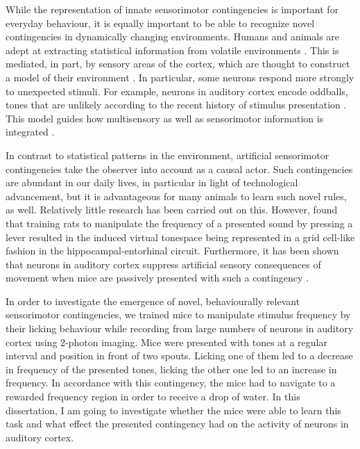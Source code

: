\documentclass[]{report}
\theoremstyle{definition}
\theoremstyle{definition}
\theoremstyle{definition}
\theoremstyle{remark}
\begin{document}
While the representation of innate sensorimotor contingencies is
important for everyday behaviour, it is equally important to be able to
recognize novel contingencies in dynamically changing environments.
Humans and animals are adept at extracting statistical information from
volatile environments \citep{behrens2007information}. This is mediated,
in part, by sensory areas of the cortex, which are thought to construct
a model of their environment \citep{berkes2011spontaneous}. In
particular, some neurons respond more strongly to unexpected stimuli.
For example, neurons in auditory cortex encode oddballs, tones that are
unlikely according to the recent history of stimulus presentation
\citep{gill2008surprise, rubin2016representation}. This model guides how
multisensory as well as sensorimotor information is integrated
\citep{gallistel2001rat, ernst2002humans, kording2004force, kording2004bayesian}.

In contrast to statistical patterns in the environment, artificial
sensorimotor contingencies take the observer into account as a causal
actor. Such contingencies are abundant in our daily lives, in particular
in light of technological advancement, but it is advantageous for many
animals to learn such novel rules, as well. Relatively little research
has been carried out on this. However, \citet{aronov2017grid} found that
training rats to manipulate the frequency of a presented sound by
pressing a lever resulted in the induced virtual tonespace being
represented in a grid cell-like fashion in the hippocampal-entorhinal
circuit. Furthermore, it has been shown that neurons in auditory cortex
suppress artificial sensory consequences of movement when mice are
passively presented with such a contingency
\citep{schneider2018cortical}.

In order to investigate the emergence of novel, behaviourally relevant
sensorimotor contingencies, we trained mice to manipulate stimulus
frequency by their licking behaviour while recording from large numbers
of neurons in auditory cortex using 2-photon imaging. Mice were
presented with tones at a regular interval and position in front of two
spouts. Licking one of them led to a decrease in frequency of the
presented tones, licking the other one led to an increase in frequency.
In accordance with this contingency, the mice had to navigate to a
rewarded frequency region in order to receive a drop of water. In this
dissertation, I am going to investigate whether the mice were able to
learn this task and what effect the presented contingency had on the
activity of neurons in auditory cortex.
\end{document}

